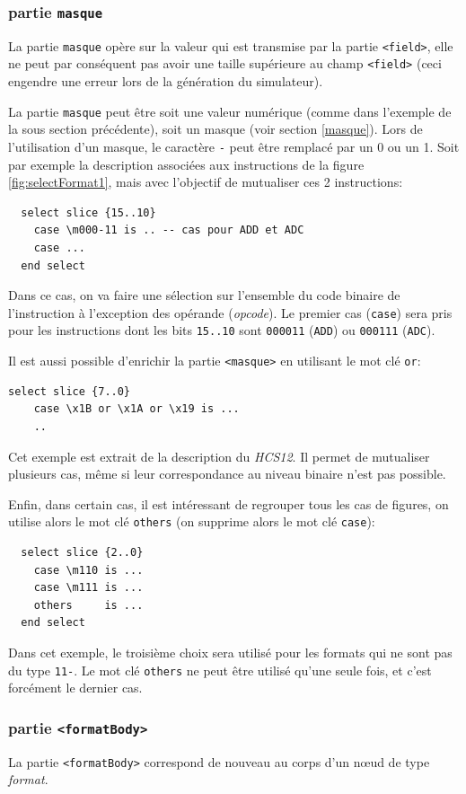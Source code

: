 \subsubsection{partie \texttt{masque}}
La partie \texttt{masque} opère sur la valeur qui est transmise par la partie \texttt{<field>}, elle ne peut par conséquent pas avoir une taille supérieure au champ \texttt{<field>} (ceci engendre une erreur lors de la génération du simulateur).

La partie \texttt{masque} peut être soit une valeur numérique (comme dans l'exemple de la sous section précédente), soit un masque (voir section \ref{masque}). Lors de l'utilisation d'un masque, le caractère \texttt{-} peut être remplacé par un 0 ou un 1. Soit par exemple la description associées aux instructions de la figure \ref{fig:selectFormat1}, mais avec l'objectif de mutualiser ces 2 instructions:
\begin{lstlisting}
  select slice {15..10}
    case \m000-11 is .. -- cas pour ADD et ADC
    case ...
  end select
\end{lstlisting}
Dans ce cas, on va faire une sélection sur l'ensemble du code binaire de l'instruction à l'exception des opérande (\emph{opcode}). Le premier cas (\texttt{case}) sera pris pour les instructions dont les bits \texttt{15..10} sont \texttt{000011} (\texttt{ADD}) ou \texttt{000111} (\texttt{ADC}).

Il est aussi possible d'enrichir la partie \texttt{<masque>} en utilisant le mot clé \texttt{or}:
\begin{lstlisting}
select slice {7..0}
    case \x1B or \x1A or \x19 is ...
    ..
\end{lstlisting}
Cet exemple est extrait de la description du \emph{HCS12}. Il permet de mutualiser plusieurs cas, même si leur correspondance au niveau binaire n'est pas possible.

Enfin, dans certain cas, il est intéressant de regrouper tous les cas de figures, on utilise alors le mot clé \texttt{others} (on supprime alors le mot clé \texttt{case}):
\begin{lstlisting}
  select slice {2..0}
    case \m110 is ...
    case \m111 is ...
    others     is ...
  end select
\end{lstlisting}
Dans cet exemple, le troisième choix sera utilisé pour les formats qui ne sont pas du type \texttt{11-}.
Le mot clé \texttt{others} ne peut être utilisé qu'une seule fois, et c'est forcément le dernier cas.

\subsubsection{partie \texttt{<formatBody>}}
La partie \texttt{<formatBody>} correspond de nouveau au corps d'un nœud de type \emph{format}.

